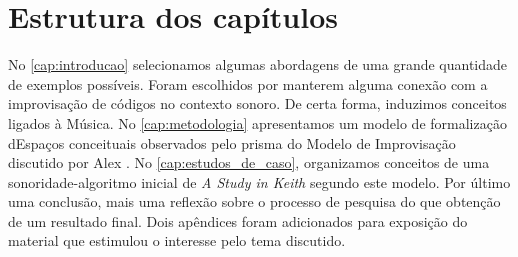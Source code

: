 \section*{Estrutura dos capítulos}

No \autoref{cap:introducao} selecionamos algumas abordagens de uma grande quantidade de exemplos possíveis. Foram escolhidos por manterem alguma conexão com a improvisação de códigos no contexto sonoro. De certa forma, induzimos conceitos ligados à Música.  No \autoref{cap:metodologia} apresentamos um modelo de formalização dEspaços conceituais observados pelo prisma do Modelo de Improvisação discutido por Alex . No \autoref{cap:estudos_de_caso}, organizamos conceitos de uma sonoridade-algoritmo inicial de \emph{A Study in Keith} segundo este modelo. Por último uma conclusão, mais uma reflexão sobre o processo de pesquisa do que obtenção de um resultado final. Dois apêndices foram adicionados para exposição do material que estimulou o interesse pelo tema discutido.

